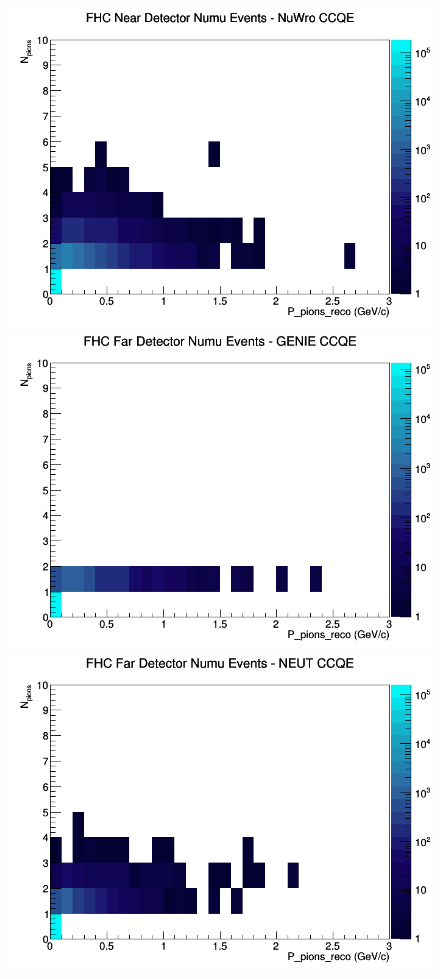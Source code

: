 \documentclass[12pt]{article}
\begin{document}
\begin{figure}[h]
\includegraphics[width=\linewidth]{eff_N_P/LAr/pions/CCQE_FHC_ND_numu_N_P_NuWro.png}
\endminipage
\newline
{}
\includegraphics[width=\linewidth]{eff_N_P/LAr/pions/CCQE_FHC_FD_numu_N_P_GENIE.png}
\endminipage
{}
\includegraphics[width=\linewidth]{eff_N_P/LAr/pions/CCQE_FHC_FD_numu_N_P_NEUT.png}

\end{figure}
\end{document}

